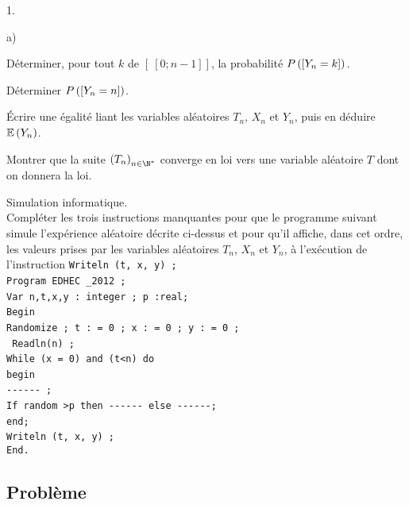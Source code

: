 \documentclass[11pt]{article}%
\begin{document}
\begin{noliste}{1.}
\begin{noliste}{a)}
 \setlength{\itemsep}{2mm}
\item Déterminer, pour tout $k$ de $\left[ \
\!\left[0;n-1\right]\!\right]$, la probabilité $P\left(\left[ {Y_{n} =
k} \right]\right)$. 
\item Déterminer $P\left(\left[ {Y_{n} = n} \right]\right)$. 
\item Écrire une égalité liant les variables aléatoires $T_{n}$,
$X_{n}$
et $Y_{n}$, puis en déduire $\mathbb{E}\left(Y_{n}\right)$.
\end{noliste}
\item Montrer que la suite $\left(T_{n}\right)_{n\in\N^{*}}$ converge
en loi vers une variable aléatoire $T$ dont on donnera la loi. 
\item Simulation informatique. \\
Compléter les trois instructions manquantes pour que le programme
suivant simule l'expérience aléatoire décrite ci-dessus et pour qu'il
affiche, dans cet ordre, les valeurs prises par les variables
aléatoires
$T_{n}$, $X_{n}$ et $Y_{n}$, à l'exécution de l'instruction
\texttt{Writeln
(t, x, y) ; }\\
\texttt{Program EDHEC \_{2}012 ; }~\\
\texttt{Var n,t,x,y : integer ; p :real; }~\\
\texttt{Begin }~\\
\texttt{Randomize ; t : = 0 ; x : = 0 ; y : = 0 ;}~\\
\texttt{ Readln(n) ; }~\\
\texttt{While (x = 0) and (t<n) do }~\\
\texttt{begin }~\\
\texttt{-{}-{}-{}-{}-{}- ; }~\\
\texttt{If random >p then -{}-{}-{}-{}-{}- else -{}-{}-{}-{}-{}-;
}~\\
\texttt{end; }~\\
\texttt{Writeln (t, x, y) ; }~\\
\texttt{End.}
\end{noliste}

\subsection*{Problème }
\end{document}
